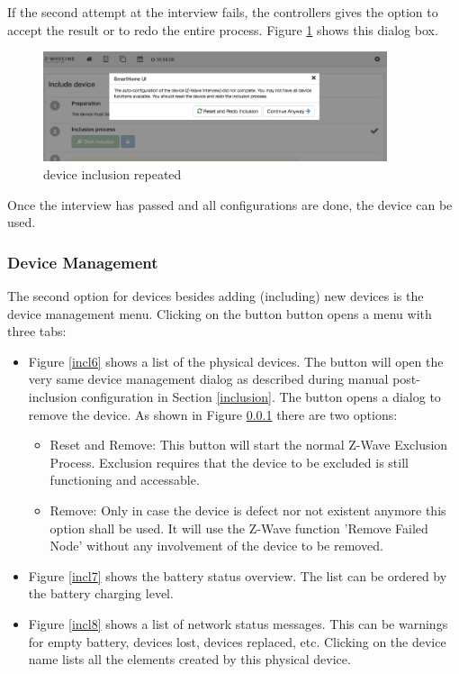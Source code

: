 If the second attempt at the interview fails, the controllers gives the option to 
accept the result or to redo the entire process. Figure \ref{incl5} shows this dialog box.

\begin{figure}
\begin{center}
\includegraphics[width=0.9\textwidth]{pngs/cap4/incl5.png}
\caption{\zwave device inclusion repeated}
\label{incl5}
\end{center}
\end{figure}

Once the interview has passed and all configurations are done, the device can be used.

\subsubsection{\zwave Device Management}

The second option for \zwave devices besides adding (including) new devices is the device 
management menu. Clicking on the button  button opens a menu with three tabs:

\begin{itemize}
\item Figure \ref{incl6} shows a list of the physical \zwave devices. The \keystroke{*} button 
will open the very same device management dialog as described during manual post-inclusion 
configuration in Section \ref{inclusion}. The  button opens a dialog to remove 
the device. As shown in Figure \ref{} there are two options:
\begin{itemize}
\item Reset and Remove: This button will start the normal Z-Wave Exclusion Process. Exclusion
requires that the device to be excluded is still functioning and accessable.
\item Remove: Only in case the device is defect nor not existent anymore this option shall be used.
It will use the Z-Wave function 'Remove Failed Node' without any involvement of the device to be removed.
\end{itemize}
\item Figure \ref{incl7} shows the battery status overview. The list can be ordered by 
the battery charging level.
\item Figure \ref{incl8} shows a list of network status messages. This can be warnings 
for empty battery, devices lost, devices replaced, etc. Clicking on the device name 
lists all the elements created by this physical device.
\end{itemize}


